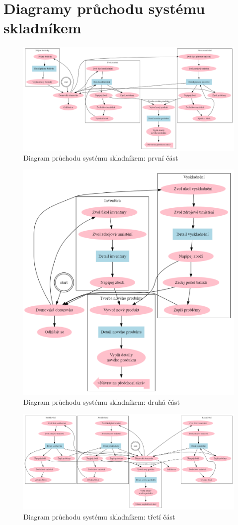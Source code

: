 \chapter{Diagramy průchodu systému skladníkem} \label{ap:diagram:storekeeper}

\begin{figure}[]
\includegraphics[width=\textwidth]{../png/diagrams/1.png}
\caption{Diagram průchodu systému skladníkem: první část} \label{picture:storekeeper1}
\end{figure}

\begin{figure}[]
\includegraphics[width=\textwidth]{../png/diagrams/2.png}
\caption{Diagram průchodu systému skladníkem: druhá část} \label{picture:storekeeper2}
\end{figure}

\begin{figure}[]
\includegraphics[width=\textwidth]{../png/diagrams/3.png}
\caption{Diagram průchodu systému skladníkem: třetí část} \label{picture:storekeeper3}
\end{figure}
